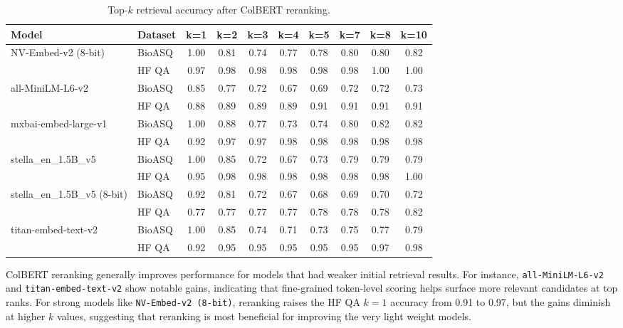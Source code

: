 \documentclass[pdflatex,sn-mathphys-num]{sn-jnl}%
\theoremstyle{thmstyleone}%
\theoremstyle{thmstyletwo}%
\theoremstyle{thmstylethree}%
\begin{document}
\begin{table}[h]
\centering
\small
\begin{tabular}{l l c c c c c c c c}
\hline
\textbf{Model} & \textbf{Dataset} & \textbf{k=1} & \textbf{k=2} & \textbf{k=3} & \textbf{k=4} & \textbf{k=5} & \textbf{k=7} & \textbf{k=8} & \textbf{k=10} \\
\hline
\multirow{2}{*}{NV-Embed-v2 (8-bit)} 
 & BioASQ & 1.00 & 0.81 & 0.74 & 0.77 & 0.78 & 0.80 & 0.80 & 0.82 \\
 & HF QA  & 0.97 & 0.98 & 0.98 & 0.98 & 0.98 & 0.98 & 1.00 & 1.00 \\
\hline
\multirow{2}{*}{all-MiniLM-L6-v2} 
 & BioASQ & 0.85 & 0.77 & 0.72 & 0.67 & 0.69 & 0.72 & 0.72 & 0.73 \\
 & HF QA  & 0.88 & 0.89 & 0.89 & 0.89 & 0.91 & 0.91 & 0.91 & 0.91 \\
\hline
\multirow{2}{*}{mxbai-embed-large-v1} 
 & BioASQ & 1.00 & 0.88 & 0.77 & 0.73 & 0.74 & 0.80 & 0.82 & 0.82 \\
 & HF QA  & 0.92 & 0.97 & 0.97 & 0.98 & 0.98 & 0.98 & 0.98 & 0.98 \\
\hline
\multirow{2}{*}{stella\_en\_1.5B\_v5} 
 & BioASQ & 1.00 & 0.85 & 0.72 & 0.67 & 0.73 & 0.79 & 0.79 & 0.79 \\
 & HF QA  & 0.95 & 0.98 & 0.98 & 0.98 & 0.98 & 0.98 & 0.98 & 1.00 \\
\hline
\multirow{2}{*}{stella\_en\_1.5B\_v5 (8-bit)} 
 & BioASQ & 0.92 & 0.81 & 0.72 & 0.67 & 0.68 & 0.69 & 0.70 & 0.72 \\
 & HF QA  & 0.77 & 0.77 & 0.77 & 0.77 & 0.78 & 0.78 & 0.78 & 0.82 \\
\hline
\multirow{2}{*}{titan-embed-text-v2} 
 & BioASQ & 1.00 & 0.85 & 0.74 & 0.71 & 0.73 & 0.75 & 0.77 & 0.79 \\
 & HF QA  & 0.92 & 0.95 & 0.95 & 0.95 & 0.95 & 0.95 & 0.97 & 0.98 \\
\hline
\end{tabular}
\caption{Top-$k$ retrieval accuracy after ColBERT reranking.}
\label{table:rerank_results}
\end{table}

ColBERT reranking generally improves performance for models that had weaker initial retrieval results. For instance, \texttt{all-MiniLM-L6-v2} and \texttt{titan-embed-text-v2} show notable gains, indicating that fine-grained token-level scoring helps surface more relevant candidates at top ranks. For strong models like \texttt{NV-Embed-v2 (8-bit)}, reranking raises the HF QA $k=1$ accuracy from 0.91 to 0.97, but the gains diminish at higher $k$ values, suggesting that reranking is most beneficial for improving the very light weight models.
\end{document}
